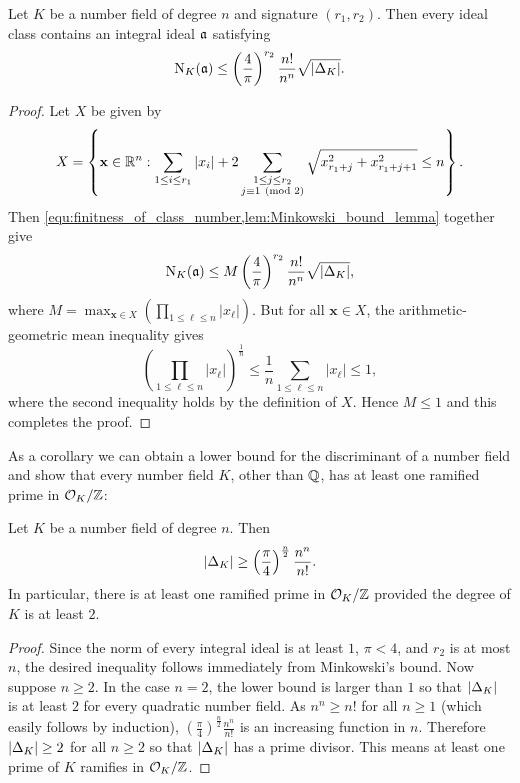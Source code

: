     \begin{theorem*}
      Let $K$ be a number field of degree $n$ and signature $(r_{1},r_{2})$. Then every ideal class contains an integral ideal $\mathfrak{a}$ satisfying
      \[
        \operatorname{\mathrm{N}}_{K}(\mathfrak{a}) \le \left(\frac{4}{\pi}\right)^{r_{2}}\frac{n!}{n^{n}}\sqrt{|\Delta_{K}|}.
      \]
    \end{theorem*}
    \begin{proof}
      Let $X$ be given by
      \[
        X = \left\{\mathbf{x} \in \mathbb{R}^{n}:\sum_{1 \le i \le r_{1}}|x_{i}|+2\sum_{\substack{1 \le j \le r_{2} \\ j \equiv 1 \ \left(\text{mod }2\right)}}\sqrt{x_{r_{1}+j}^{2}+x_{r_{1}+j+1}^{2}} \le n\right\}.
      \]
      Then \cref{equ:finitness_of_class_number,lem:Minkowski_bound_lemma} together give
      \[
        \operatorname{\mathrm{N}}_{K}(\mathfrak{a}) \le M\left(\frac{4}{\pi}\right)^{r_{2}}\frac{n!}{n^{n}}\sqrt{|\Delta_{K}|},
      \]
      where $M = \max_{\mathbf{x} \in X}\left(\prod_{1 \le \ell \le n}|x_{\ell}|\right)$. But for all $\mathbf{x} \in X$, the arithmetic-geometric mean inequality gives
      \[
        \left(\prod_{1 \le \ell \le n}|x_{\ell}|\right)^{\frac{1}{n}} \le \frac{1}{n}\sum_{1 \le \ell \le n}|x_{\ell}| \le 1,
      \]
      where the second inequality holds by the definition of $X$. Hence $M \le 1$ and this completes the proof.
    \end{proof}

    As a corollary we can obtain a lower bound for the discriminant of a number field and show that every number field $K$, other than $\mathbb{Q}$, has at least one ramified prime in $\mathcal{O}_{K}/\mathbb{Z}$:

    \begin{corollary}
      Let $K$ be a number field of degree $n$. Then
      \[
        |\Delta_{K}| \ge \left(\frac{\pi}{4}\right)^{\frac{n}{2}}\frac{n^{n}}{n!}.
      \]
      In particular, there is at least one ramified prime in $\mathcal{O}_{K}/\mathbb{Z}$ provided the degree of $K$ is at least $2$. 
    \end{corollary}
    \begin{proof}
      Since the norm of every integral ideal is at least $1$, $\pi < 4$, and $r_{2}$ is at most $n$, the desired inequality follows immediately from Minkowski's bound. Now suppose $n \ge 2$. In the case $n = 2$, the lower bound is larger than $1$ so that $|\Delta_{K}|$ is at least $2$ for every quadratic number field. As $n^{n} \ge n!$ for all $n \ge 1$ (which easily follows by induction), $\left(\frac{\pi}{4}\right)^{\frac{n}{2}}\frac{n^{n}}{n!}$ is an increasing function in $n$. Therefore $|\Delta_{K}| \ge 2$ for all $n \ge 2$ so that $|\Delta_{K}|$ has a prime divisor. This means at least one prime of $K$ ramifies in $\mathcal{O}_{K}/\mathbb{Z}$.
    \end{proof}

